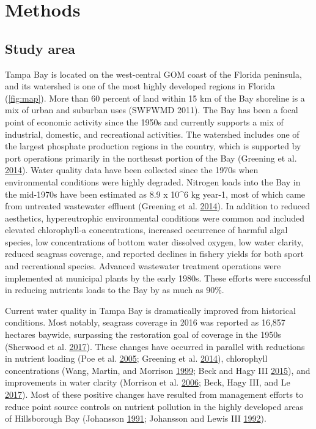 \documentclass[]{article}
\begin{document}
\hypertarget{methods}{%
\section{Methods}\label{methods}}

\hypertarget{study-area}{%
\subsection{Study area}\label{study-area}}

Tampa Bay is located on the west-central GOM coast of the Florida
peninsula, and its watershed is one of the most highly developed regions
in Florida (\cref{fig:map}). More than 60 percent of land within 15 km
of the Bay shoreline is a mix of urban and suburban uses (SWFWMD 2011).
The Bay has been a focal point of economic activity since the 1950s and
currently supports a mix of industrial, domestic, and recreational
activities. The watershed includes one of the largest phosphate
production regions in the country, which is supported by port operations
primarily in the northeast portion of the Bay (Greening et al.
\protect\hyperlink{ref-Greening2014}{2014}). Water quality data have
been collected since the 1970s when environmental conditions were highly
degraded. Nitrogen loads into the Bay in the mid-1970s have been
estimated as 8.9 x 10\^{}6 kg year-1, most of which came from untreated
wastewater effluent (Greening et al.
\protect\hyperlink{ref-Greening2014}{2014}). In addition to reduced
aesthetics, hypereutrophic environmental conditions were common and
included elevated chlorophyll-a concentrations, increased occurrence of
harmful algal species, low concentrations of bottom water dissolved
oxygen, low water clarity, reduced seagrass coverage, and reported
declines in fishery yields for both sport and recreational species.
Advanced wastewater treatment operations were implemented at municipal
plants by the early 1980s. These efforts were successful in reducing
nutrients loads to the Bay by as much as 90\%.

Current water quality in Tampa Bay is dramatically improved from
historical conditions. Most notably, seagrass coverage in 2016 was
reported as 16,857 hectares baywide, surpassing the restoration goal of
coverage in the 1950s (Sherwood et al.
\protect\hyperlink{ref-Sherwood17}{2017}). These changes have occurred
in parallel with reductions in nutrient loading (Poe et al.
\protect\hyperlink{ref-Poe05}{2005}; Greening et al.
\protect\hyperlink{ref-Greening2014}{2014}), chlorophyll concentrations
(Wang, Martin, and Morrison \protect\hyperlink{ref-Wang99}{1999}; Beck
and Hagy III \protect\hyperlink{ref-Beck15}{2015}), and improvements in
water clarity (Morrison et al. \protect\hyperlink{ref-Morrison06}{2006};
Beck, Hagy III, and Le \protect\hyperlink{ref-Beck17c}{2017}). Most of
these positive changes have resulted from management efforts to reduce
point source controls on nutrient pollution in the highly developed
areas of Hillsborough Bay (Johansson
\protect\hyperlink{ref-Johansson91}{1991}; Johansson and Lewis III
\protect\hyperlink{ref-Johansson92}{1992}).
\end{document}
